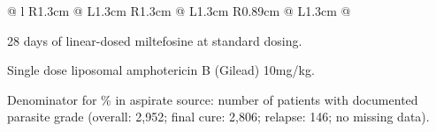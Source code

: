 \begin{table}[htbp]
\begin{threeparttable}
\begin{tabular}{@{} l R{1.3cm} @{\hspace{4pt}} L{1.3cm} R{1.3cm} @{\hspace{4pt}} L{1.3cm} R{0.89cm} @{\hspace{4pt}} L{1.3cm} @{}}
            \bottomrule
        \end{tabular}
        \begin{tablenotes}
            \footnotesize
            \item[1] 28 days of linear-dosed miltefosine at standard dosing.
            \item[2] Single dose liposomal amphotericin B (Gilead) 10mg/kg.
            \item[3] Denominator for \% in aspirate source: number of patients with documented parasite grade (overall: 2,952; final cure: 2,806; relapse: 146; no missing data).
        \end{tablenotes}
    \end{threeparttable}
    \caption{ of categorical candidate predictors and parasite source across contributed studies from the Indian subcontinent.  Missing data are described where present. SDA: Single dose liposomal amphotericin B 10mg/kg.}
    \label{tab:isc_categorical}
\end{table}